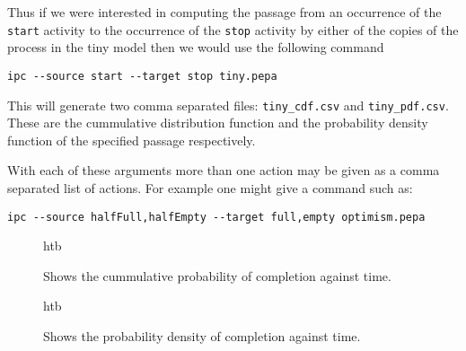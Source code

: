 Thus if we were interested in computing the passage from an occurrence
of the \texttt{start} activity to the occurrence of the \texttt{stop}
activity by either of the copies of the process in the tiny model then
we would use the following command
%
%
\begin{verbatim}
ipc --source start --target stop tiny.pepa
\end{verbatim}

This will generate two comma separated files:
\texttt{tiny\_cdf.csv} and \texttt{tiny\_pdf.csv}.
These are the cummulative distribution function and the probability
density function of the specified passage respectively.

With each of these arguments more than one action may be given as a 
comma separated list of actions.
For example one might give a command such as:
\begin{verbatim}
ipc --source halfFull,halfEmpty --target full,empty optimism.pepa
\end{verbatim}


\begin{figure}{htb}
\caption{
\label{figure:tiny-passage-time-results}
Shows the cummulative probability of completion against time.
}
\end{figure}

\begin{figure}{htb}
\caption{
\label{figure:tiny-passage-time-pdf-results}
Shows the probability density of completion against time.
}
\end{figure}


